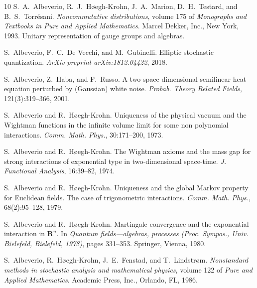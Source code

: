 \documentclass[a4paper,10pt]{article}
\newcommand{\tmmathbf}[1]{\ensuremath{\boldsymbol{#1}}}
\newcommand{\tmtextit}[1]{{\itshape{#1}}}
\begin{document}
\begin{thebibliography}{10}
  S.~A.~Albeverio, R.~J.~H{\o}egh-Krohn, J.~A.~Marion,
  D.~H.~Testard, and  B.~S.~Torr{\'e}sani. {\newblock}\tmtextit{Noncommutative
  distributions},  volume  175  of \tmtextit{Monographs and Textbooks in Pure
  and Applied Mathematics}. {\newblock}Marcel Dekker, Inc., New York, 1993.
  {\newblock}Unitary representation of gauge groups and algebras.{\newblock}
  
  S.~Albeverio, F.~C.~De Vecchi, and 
  M.~Gubinelli. {\newblock}Elliptic stochastic quantization.
  {\newblock}\tmtextit{ArXiv preprint arXiv:1812.04422}, 2018.{\newblock}
  
  S.~Albeverio, Z.~Haba, and  F.~Russo. {\newblock}A
  two-space dimensional semilinear heat equation perturbed by (Gaussian) white
  noise. {\newblock}\tmtextit{Probab. Theory Related Fields}, 121(3):319--366,
  2001.{\newblock}
  
  S.~Albeverio  and  R.~H{\o}egh-Krohn.
  {\newblock}Uniqueness of the physical vacuum and the Wightman functions in
  the infinite volume limit for some non polynomial interactions.
  {\newblock}\tmtextit{Comm. Math. Phys.}, 30:171--200, 1973.{\newblock}
  
  S.~Albeverio  and  R.~H{\o}egh-Krohn. {\newblock}The
  Wightman axioms and the mass gap for strong interactions of exponential type
  in two-dimensional space-time. {\newblock}\tmtextit{J. Functional Analysis},
  16:39--82, 1974.{\newblock}
  
  S.~Albeverio  and  R.~H{\o}egh-Krohn.
  {\newblock}Uniqueness and the global Markov property for Euclidean fields.
  The case of trigonometric interactions. {\newblock}\tmtextit{Comm. Math.
  Phys.}, 68(2):95--128, 1979.{\newblock}
  
  S.~Albeverio  and  R.~H{\o}egh-Krohn.
  {\newblock}Martingale convergence and the exponential interaction in
  $\tmmathbf{R}^n$. {\newblock}In \tmtextit{Quantum fields---algebras,
  processes (Proc. Sympos., Univ. Bielefeld, Bielefeld, 1978)},  pages 
  331--353. Springer, Vienna, 1980.{\newblock}
  
  S.~Albeverio, R.~H{\o}egh-Krohn, J.~E.~Fenstad, and 
  T.~Lindstr{\o}m. {\newblock}\tmtextit{Nonstandard methods in stochastic
  analysis and mathematical physics},  volume  122  of \tmtextit{Pure and
  Applied Mathematics}. {\newblock}Academic Press, Inc., Orlando, FL,
  1986.{\newblock}
  

\end{thebibliography}
\end{document}
